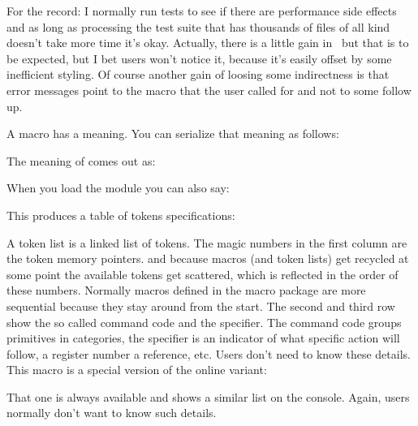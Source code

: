 For the record: I normally run tests to see if there are performance side effects
and as long as processing the test suite that has thousands of files of all kind
doesn't take more time it's okay. Actually, there is a little gain in \CONTEXT\
but that is to be expected, but I bet users won't notice it, because it's easily
offset by some inefficient styling. Of course another gain of loosing some
indirectness is that error messages point to the macro that the user called for
and not to some follow up.

\stopsection

\startsection[title=Introspection]

A macro has a meaning. You can serialize that meaning as follows:

\startbuffer[definition]
\tolerant\protected{}

\meaning\foo
\stopbuffer

\typebuffer[definition][option=TEX]

The meaning of \type {\foo} comes out as:

\startnarrower \getbuffer[definition] \stopnarrower

When you load the module  you can also say:

\startbuffer[example]
\luatokentable\foo
\stopbuffer

\typebuffer[example][option=TEX]

This produces a table of tokens specifications:

{\getbuffer[definition]\getbuffer[example]}

A token list is a linked list of tokens. The magic numbers in the first column
are the token memory pointers. and because macros (and token lists) get recycled
at some point the available tokens get scattered, which is reflected in the order
of these numbers. Normally macros defined in the macro package are more sequential
because they stay around from the start. The second and third row show the so
called command code and the specifier. The command code groups primitives in
categories, the specifier is an indicator of what specific action will follow, a
register number a reference, etc. Users don't need to know these details. This
macro is a special version of the online variant:

\starttyping[option=TEX]
\showluatokens\foo
\stoptyping

That one is always available and shows a similar list on the console. Again, users
normally don't want to know such details.

